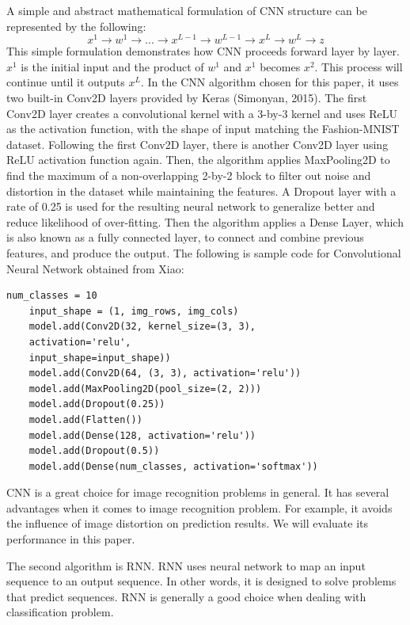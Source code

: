 \documentclass[letterpaper]{article} %
\begin{document}
	A simple and abstract mathematical formulation of CNN structure can be represented by the following:
	$$x^1\rightarrow w^1 \rightarrow ... \rightarrow x^{L-1} \rightarrow w^{L-1} \rightarrow x^L \rightarrow w^L \rightarrow z$$
	This simple formulation demonstrates how CNN proceeds forward layer by layer. $x^1$ is the initial input and the product of $w^1$ and $x^1$ becomes $x^2$. This process will continue until it outputs $x^{L}$. In the CNN algorithm chosen for this paper, it uses two built-in Conv2D layers provided by Keras (Simonyan, 2015). The first Conv2D layer creates a convolutional kernel with a 3-by-3 kernel and uses ReLU as the activation function, with the shape of input matching the Fashion-MNIST dataset. Following the first Conv2D layer, there is another Conv2D layer using ReLU activation function again. Then, the algorithm applies MaxPooling2D to find the maximum of a non-overlapping 2-by-2 block to filter out noise and distortion in the dataset while maintaining the features. A Dropout layer with a rate of 0.25 is used for the resulting neural network to generalize better and reduce likelihood of over-fitting. Then the algorithm applies a Dense Layer, which is also known as a fully connected layer, to connect and combine previous features, and produce the output. The following is sample code for Convolutional Neural Network obtained from Xiao:
	\begin{lstlisting}[columns=fullflexible, keepspaces=true, stepnumber=1]
	num_classes = 10
	input_shape = (1, img_rows, img_cols)
	model.add(Conv2D(32, kernel_size=(3, 3),
	activation='relu',
	input_shape=input_shape))
	model.add(Conv2D(64, (3, 3), activation='relu'))
	model.add(MaxPooling2D(pool_size=(2, 2)))
	model.add(Dropout(0.25))
	model.add(Flatten())
	model.add(Dense(128, activation='relu'))
	model.add(Dropout(0.5))
	model.add(Dense(num_classes, activation='softmax'))
	\end{lstlisting}
	
	CNN is a great choice for image recognition problems in general. It has several advantages when it comes to image recognition problem. For example, it avoids the influence of image distortion on prediction results. We will evaluate its performance in this paper.
	
	The second algorithm is RNN. RNN uses neural network to map an input sequence to an output sequence. In other words, it is designed to solve problems that predict sequences. RNN is generally a good choice when dealing with classification problem. 
	
\end{document}
